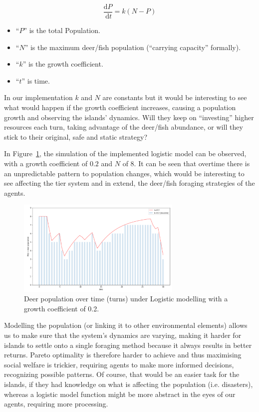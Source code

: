 \begin{equation}
\frac{\mathrm{d} P}{\mathrm{~d} t}=k(N-P)
\label{eq:Population Density}
\end{equation}

\begin{itemize}
        \item “$P$” is the total Population. \item “$N$” is the maximum deer/fish population (“carrying capacity” formally).
        \item “$k$” is the growth coefficient.
        \item “$t$” is time.
    \end{itemize}

In our implementation $k$ and $N$ are constants but it would be interesting to see what would happen if the growth coefficient increases, causing a population growth and observing the islands’ dynamics. Will they keep on “investing” higher resources each turn, taking advantage of the deer/fish abundance, or will they stick to their original, safe and static strategy?

In Figure~\ref{fig:Deer population over time}, the simulation of the implemented logistic model can be observed, with a growth coefficient of $0.2$ and $N$ of $8$. It can be seen that overtime there is an unpredictable pattern to population changes, which would be interesting to see affecting the tier system and in extend, the deer/fish foraging strategies of the agents.

\begin{figure}[!htb]
    \centering
    \includegraphics[width=0.7\textwidth]{04_environment/Images/Deer population over time.PNG}
    \caption{Deer population over time (turns) under Logistic modelling with a growth coefficient of 0.2.}
    \label{fig:Deer population over time}
\end{figure}

Modelling the population (or linking it to other environmental elements) allows us to make sure that the system’s dynamics are varying, making it harder for islands to settle onto a single foraging method because it always results in better returns. Pareto optimality is therefore harder to achieve and thus maximising social welfare is trickier, requiring agents to make more informed decisions, recognizing possible patterns. Of course, that would be an easier task for the islands, if they had knowledge on what is affecting the population (i.e. disasters), whereas a logistic model function might be more abstract in the eyes of our agents, requiring more processing. 

